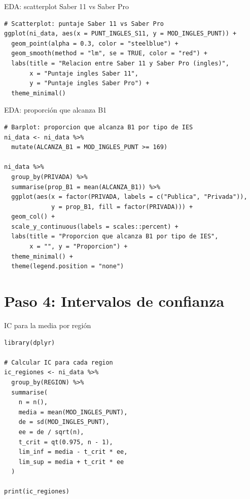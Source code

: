 \documentclass[aspectratio=169, 11pt]{beamer}
\begin{document}
\begin{frame}[fragile]{EDA: scatterplot Saber 11 vs Saber Pro}
\begin{lstlisting}
# Scatterplot: puntaje Saber 11 vs Saber Pro
ggplot(ni_data, aes(x = PUNT_INGLES_S11, y = MOD_INGLES_PUNT)) +
  geom_point(alpha = 0.3, color = "steelblue") +
  geom_smooth(method = "lm", se = TRUE, color = "red") +
  labs(title = "Relacion entre Saber 11 y Saber Pro (ingles)",
       x = "Puntaje ingles Saber 11",
       y = "Puntaje ingles Saber Pro") +
  theme_minimal()
\end{lstlisting}
\end{frame}

\begin{frame}[fragile]{EDA: proporción que alcanza B1}
\begin{lstlisting}
# Barplot: proporcion que alcanza B1 por tipo de IES
ni_data <- ni_data %>%
  mutate(ALCANZA_B1 = MOD_INGLES_PUNT >= 169)

ni_data %>%
  group_by(PRIVADA) %>%
  summarise(prop_B1 = mean(ALCANZA_B1)) %>%
  ggplot(aes(x = factor(PRIVADA, labels = c("Publica", "Privada")),
             y = prop_B1, fill = factor(PRIVADA))) +
  geom_col() +
  scale_y_continuous(labels = scales::percent) +
  labs(title = "Proporcion que alcanza B1 por tipo de IES",
       x = "", y = "Proporcion") +
  theme_minimal() +
  theme(legend.position = "none")
\end{lstlisting}
\end{frame}

\section{Paso 4: Intervalos de confianza}

\begin{frame}[fragile]{IC para la media por región}
\begin{lstlisting}
library(dplyr)

# Calcular IC para cada region
ic_regiones <- ni_data %>%
  group_by(REGION) %>%
  summarise(
    n = n(),
    media = mean(MOD_INGLES_PUNT),
    de = sd(MOD_INGLES_PUNT),
    ee = de / sqrt(n),
    t_crit = qt(0.975, n - 1),
    lim_inf = media - t_crit * ee,
    lim_sup = media + t_crit * ee
  )

print(ic_regiones)
\end{lstlisting}
\end{frame}
\end{document}
